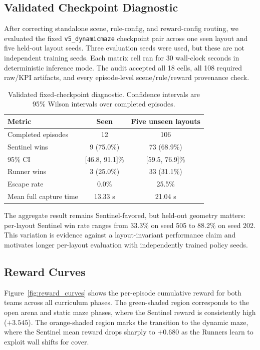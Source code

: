 \documentclass[conference]{IEEEtran}
\begin{document}
\subsection{Validated Checkpoint Diagnostic}

After correcting standalone scene, rule-config, and reward-config routing, we evaluated the fixed \texttt{v5\_dynamicmaze} checkpoint pair across one seen layout and five held-out layout seeds. Three evaluation seeds were used, but these are not independent training seeds. Each matrix cell ran for 30 wall-clock seconds in deterministic inference mode. The audit accepted all 18 cells, all 108 required raw/KPI artifacts, and every episode-level scene/rule/reward provenance check.

\begin{table}[t]
\centering
\caption{Validated fixed-checkpoint diagnostic. Confidence intervals are 95\% Wilson intervals over completed episodes.}
\label{tab:validated_diagnostic}
\begin{tabular}{lcc}
\toprule
Metric & Seen & Five unseen layouts \\
\midrule
Completed episodes & 12 & 106 \\
Sentinel wins & 9 (75.0\%) & 73 (68.9\%) \\
95\% CI & [46.8, 91.1]\% & [59.5, 76.9]\% \\
Runner wins & 3 (25.0\%) & 33 (31.1\%) \\
Escape rate & 0.0\% & 25.5\% \\
Mean full capture time & 13.33 s & 21.04 s \\
\bottomrule
\end{tabular}
\end{table}

The aggregate result remains Sentinel-favored, but held-out geometry matters: per-layout Sentinel win rate ranges from 33.3\% on seed 505 to 88.2\% on seed 202. This variation is evidence against a layout-invariant performance claim and motivates longer per-layout evaluation with independently trained policy seeds.

\subsection{Reward Curves}

Figure~\ref{fig:reward_curves} shows the per-episode cumulative reward for both teams across all curriculum phases. The green-shaded region corresponds to the open arena and static maze phases, where the Sentinel reward is consistently high ($+3.545$). The orange-shaded region marks the transition to the dynamic maze, where the Sentinel mean reward drops sharply to $+0.680$ as the Runners learn to exploit wall shifts for cover.
\end{document}
